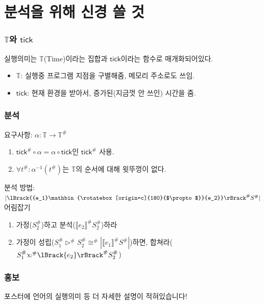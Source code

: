 \documentclass{beamer}
\newcommand*{\A}[1]{{#1}^{\#}}
\newcommand*{\Time}{\mathbb{T}}
\newcommand*{\semlink}{\mathbin{\rotatebox[origin=c]{180}{$\propto$}}}
\newcommand*{\link}[2]{{#1}\semlink{#2}}
\newcommand*{\sembracket}[1]{\lBrack{#1}\rBrack}
\newcommand*{\tick}{\mathsf{tick}}
\begin{document}
\section{분석을 위해 신경 쓸 것}
\begin{frame}[c]
  \frametitle{$\Time$와 $\tick$}
  실행의미는 $\Time$(Time)이라는 집합과 $\tick$이라는 함수로 매개화되어있다.
  \begin{itemize}
    \item $\Time$: 실행중 프로그램 지점을 구별해줌, 메모리 주소로도 쓰임.
    \item $\tick$: 현재 환경을 받아서, 증가된(지금껏 안 쓰인) 시간을 줌.
  \end{itemize}
\end{frame}
\begin{frame}[c]
  \frametitle{분석}
  요구사항: $\alpha:\Time\rightarrow\A\Time$
  \begin{enumerate}
    \item $\A\tick\circ\alpha=\alpha\circ\tick$인 $\A\tick$ 사용.
    \item $\forall\A{t}:\alpha^{-1}(\A{t})$는 $\Time$의 순서에 대해 윗뚜껑이 없다.
  \end{enumerate}
  분석 방법: $|\A{\sembracket{\link{e_1}{e_2}}}\A{S}|$ 어림잡기
  \begin{enumerate}
    \item 가정($\A{S}_2$)하고 분석($\A{\sembracket{e_2}}\A{S}_2$)하라
    \item 가정이 성립($\A{S}_1\A\rhd\A{S}_2\A\cong|\A{\sembracket{e_1}}\A{S}|$)하면, 합쳐라($\A{S}_1\A\semlink\A{\sembracket{e_2}}\A{S}_2$)
  \end{enumerate}
\end{frame}
\begin{frame}[c]
  \frametitle{홍보}
  \begin{center}
    포스터에 언어의 실행의미 등 더 자세한 설명이 적혀있습니다!
  \end{center}
\end{frame}
\end{document}
